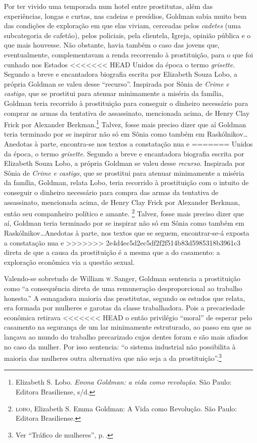 Por ter vivido uma temporada num hotel entre prostitutas, além das
experiências, longas e curtas, nas cadeias e presídios, Goldman sabia
muito bem das condições de exploração em que elas viviam, cerceadas
pelos \textit{cadetes} (uma subcategoria de cafetão), pelos policiais, pela
clientela, Igreja, opinião pública e o que mais houvesse. Não obstante,
havia também o caso das jovens que, eventualmente, complementavam a
renda recorrendo à prostituição, para o que foi cunhado nos Estados
<<<<<<< HEAD
Unidos da época o termo \emph{grisette.} Segundo a breve e encantadora
biografia escrita por Elizabeth Souza Lobo, a própria Goldman se valeu
desse ``recurso''. Inspirada por Sônia de \emph{Crime e castigo}, que se
prostitui para atenuar minimamente a miséria da família, Goldman
teria recorrido à prostituição para conseguir o
dinheiro necessário para comprar as armas da tentativa de assassinato,
mencionada acima, de Henry Clay Frick por Alexander Berkman.\footnote{Elizabeth S. Lobo. \textit{Emma Goldman: a vida como revolução}. São Paulo: Editora Brasiliense, s/d.}
Talvez, fosse mais preciso dizer que aí Goldman teria terminado por se
inspirar não só em Sônia como também em Raskólnikov\ldots{} Anedotas à parte,
encontra-se nos textos a constatação nua e
=======
Unidos da época, o termo \textit{grisette}. Segundo a breve e encantadora
biografia escrita por Elizabeth Souza Lobo, a própria Goldman se valeu
desse \textit{recurso}. Inspirada por Sônia de \textit{Crime e castigo}, que se
prostitui para atenuar minimamente a miséria da família, Goldman, relata
Lobo, teria recorrido à prostituição com o intuito de conseguir o
dinheiro necessário para compra das armas da tentativa de assassinato,
mencionada acima, de Henry Clay Frick por Alexander Berkman, então seu
companheiro político e amante. \footnote{\textsc{lobo}, Elizabeth S. Emma
  Goldman: A Vida como Revolução. São Paulo: Editora Brasiliense.}
Talvez, fosse mais preciso dizer que aí, Goldman teria terminado por se
inspirar não só em Sônia como também em Raskólnikov\ldots Anedotas à parte,
nos textos que se seguem, encontrar-se-á exposta a constatação nua e
>>>>>>> 2e4d4ec5d2ec5df2f2f514b83d5985318b3961c3
direta de que a causa da prostituição é a mesma que a do casamento: a
exploração econômica via a questão sexual.

Valendo-se sobretudo de William \textsc{w}.\,Sanger, Goldman sentencia a
prostituição como ``a consequência direta de uma remuneração
desproporcional ao trabalho honesto.'' A esmagadora maioria das
prostitutas, segundo os estudos que relata, era formada por mulheres e
garotas da classe trabalhadora. Pois a precariedade econômica retirava
<<<<<<< HEAD
o então privilégio ``moral'' de esperar pelo casamento na segurança
de um lar minimamente estruturado, ao passo em que
as lançava ao mundo do trabalho precarizado cujos dentes
foram e são mais afiados no caso da mulher. Por isso sentencia:
``o sistema industrial não possibilita à maioria das mulheres outra alternativa que não seja a da prostituição''.\footnote{Ver ``Tráfico de mulheres'', p.\,\pageref{trafico}.}

